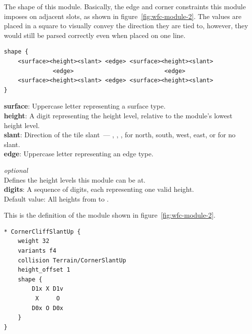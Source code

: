 The shape of this module.
Basically, the edge and corner constraints this module imposes on adjacent slots, as shown in figure~\ref{fig:wfc-module-2}.
The values are placed in a square to visually convey the direction they are tied to, however, they would still be parsed correctly even when placed on one line.
\begin{verbatim}
shape {
    <surface><height><slant> <edge> <surface><height><slant>
              <edge>                          <edge>
    <surface><height><slant> <edge> <surface><height><slant>
}
\end{verbatim}
\textbf{surface}: Uppercase letter representing a surface type.\\
\textbf{height}: A digit representing the height level, relative to the module's lowest height level.\\
\textbf{slant}: Direction of the tile slant~--- \mono{\^}, , \mono{<}, \mono{>} for north, south, west, east, or  for no slant.\\
\textbf{edge}: Uppercase letter representing an edge type.

\emph{optional}\\
Defines the height levels this module can be at.\\
\textbf{digits}: A sequence of digits, each representing one valid height.\\
Default value: All heights from  to .

\pagebreak

This is the definition of the module shown in figure~\ref{fig:wfc-module-2}.
\begin{verbatim}
* CornerCliffSlantUp {
    weight 32
    variants f4
    collision Terrain/CornerSlantUp
    height_offset 1
    shape {
        D1x X D1v
         X     O
        D0x O D0x
    }
}
\end{verbatim}

